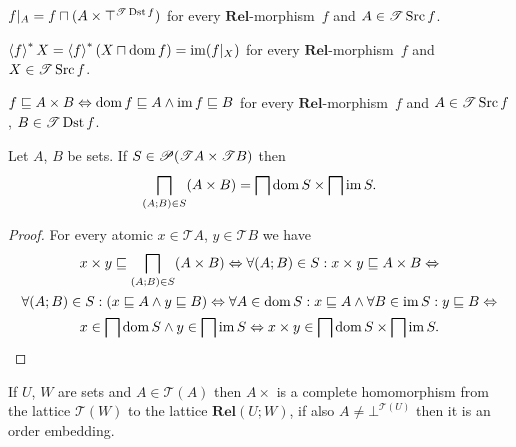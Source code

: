 \begin{obvious}
$f|_{A}=f\sqcap(A\times\top^{\mathscr{T}\operatorname{Dst} f})$ for every $\mathbf{Rel}$-morphism~$f$
and $A\in\mathscr{T}\operatorname{Src} f$.
\end{obvious}

\begin{obvious}
$\left\langle f\right\rangle ^{\ast}X=\left\langle f\right\rangle ^{\ast}(X\sqcap\operatorname{dom} f)=\operatorname{im}(f|_{X})$ for every $\mathbf{Rel}$-morphism~$f$
and $X\in\mathscr{T}\operatorname{Src} f$.
\end{obvious}

\begin{obvious}
$f\sqsubseteq A\times B\Leftrightarrow\operatorname{dom} f\sqsubseteq A\land\operatorname{im} f\sqsubseteq B$
for every $\mathbf{Rel}$-morphism~$f$ and $A\in\mathscr{T}\operatorname{Src} f$,
\textbf{$B\in\mathscr{T}\operatorname{Dst} f$}.\end{obvious}
\begin{thm}
Let $A$, $B$ be sets. If $S\in\mathscr{P}(\mathscr{T}A\times\mathscr{T}B)$
then
\[
\bigsqcap_{(A;B)\in S}(A\times B)=\bigsqcap\operatorname{dom} S\times\bigsqcap\operatorname{im} S.
\]
\end{thm}
\begin{proof}
For every atomic $x\in\mathscr{T}A$, $y\in\mathscr{T}B$ we have
\begin{multline*}
x\times y\sqsubseteq\bigsqcap_{(A;B)\in S}(A\times B)\Leftrightarrow\forall(A;B)\in S:x\times y\sqsubseteq A\times B\Leftrightarrow\\
\forall(A;B)\in S:(x\sqsubseteq A\land y\sqsubseteq B)\Leftrightarrow\forall A\in\operatorname{dom} S:x\sqsubseteq A\land\forall B\in\operatorname{im} S:y\sqsubseteq B\Leftrightarrow\\
x\in\bigsqcap\operatorname{dom} S\land y\in\bigsqcap\operatorname{im} S\Leftrightarrow x\times y\in\bigsqcap\operatorname{dom} S\times\bigsqcap\operatorname{im} S.
\end{multline*}
\end{proof}
\begin{obvious}
If $U$, $W$ are sets and $A\in\mathscr{T}(A)$ then $A\times$ is
a complete homomorphism from the lattice $\mathscr{T}(W)$ to the
lattice $\mathbf{Rel}(U;W)$, if also $A\ne\bot^{\mathscr{T}(U)}$
then it is an order embedding.\end{obvious}

